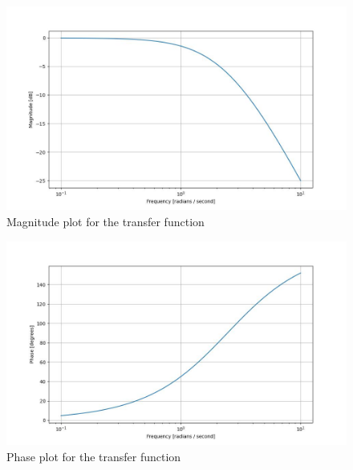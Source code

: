 \documentclass[journal,12pt,twocolumn]{IEEEtran}
\theoremstyle{remark}
\begin{document}
\begin{figure}[!ht]
\centering
\begin{center}
\includegraphics[width=\columnwidth]{2022/IN/15/figs/Figure_1.jpg}
\end{center}
\caption{Magnitude plot for the transfer function}
\end{figure}
\begin{figure}[!ht]
\centering
\begin{center}
\includegraphics[width=\columnwidth]{2022/IN/15/figs/Figure_2.jpg}
\end{center}
\caption{Phase plot for the transfer function}
\end{figure}
\end{document}
